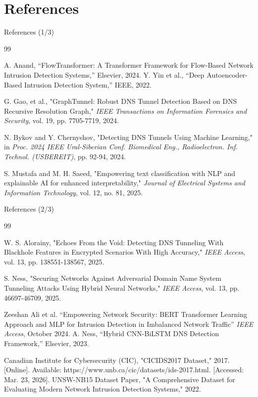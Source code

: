 \documentclass[aspectratio=169,xcolor=dvipsnames]{beamer}
\begin{document}
\section{References}
\begin{frame}{References (1/3)}
\small
\begin{thebibliography}{99}

A. Anand, “FlowTransformer: A Transformer Framework for Flow-Based Network Intrusion Detection Systems,” Elsevier, 2024.
 Y. Yin et al., “Deep Autoencoder-Based Intrusion Detection System,” IEEE, 2022.

 G. Gao, et al., "GraphTunnel: Robust DNS Tunnel Detection Based on DNS Recursive Resolution Graph," \textit{IEEE Transactions on Information Forensics and Security}, vol. 19, pp. 7705-7719, 2024.

 N. Bykov and Y. Chernyshov, "Detecting DNS Tunnels Using Machine Learning," in \textit{Proc. 2024 IEEE Ural-Siberian Conf. Biomedical Eng., Radioelectron. Inf. Technol. (USBEREIT)}, pp. 92-94, 2024.

 S. Mustafa and M. H. Saeed, "Empowering text classification with NLP and explainable AI for enhanced interpretability," \textit{Journal of Electrical Systems and Information Technology}, vol. 12, no. 81, 2025.

\end{thebibliography}
\end{frame}

\begin{frame}{References (2/3)}
\small
\begin{thebibliography}{99}
\setcounter{enumiv}{5} 

 W. S. Alorainy, "Echoes From the Void: Detecting DNS Tunneling With Blackhole Features in Encrypted Scenarios With High Accuracy," \textit{IEEE Access}, vol. 13, pp. 138551-138567, 2025.

 S. Ness, "Securing Networks Against Adversarial Domain Name System Tunneling Attacks Using Hybrid Neural Networks," \textit{IEEE Access}, vol. 13, pp. 46697-46709, 2025.


 Zeeshan Ali et al. ``Empowering Network Security: BERT Transformer Learning Approach and MLP for Intrusion Detection in Imbalanced Network Traffic'' \emph{IEEE Access}, October 2024.
 A. Ness, “Hybrid CNN-BiLSTM DNS Detection Framework,” Elsevier, 2023.

Canadian Institute for Cybersecurity (CIC),
"CICIDS2017 Dataset," 2017. [Online]. Available: https://www.unb.ca/cic/datasets/ids-2017.html. [Accessed: Mar. 23, 2026].
UNSW-NB15 Dataset Paper, "A Comprehensive Dataset for Evaluating Modern Network Intrusion Detection Systems," 2022.

\end{thebibliography}
\end{frame}
\end{document}
